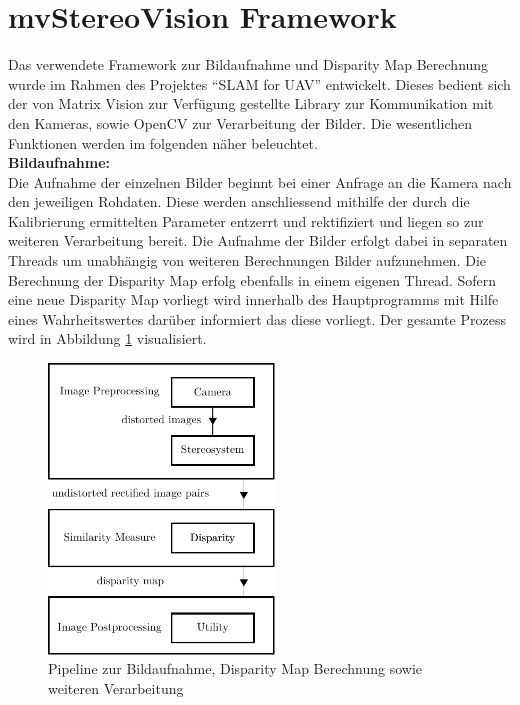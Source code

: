 
\section{mvStereoVision Framework}
\label{sec:framework}
Das verwendete Framework zur Bildaufnahme und Disparity Map Berechnung wurde im Rahmen des Projektes “SLAM for UAV” entwickelt. Dieses bedient sich der von Matrix Vision zur Verfügung gestellte Library \cite{matrixvision} zur Kommunikation mit den Kameras, sowie OpenCV \cite{opencv} zur Verarbeitung der Bilder. Die wesentlichen Funktionen werden im folgenden näher beleuchtet.\\

\noindent
\textbf{Bildaufnahme:}\\
Die Aufnahme der einzelnen Bilder beginnt bei einer Anfrage an die Kamera nach den jeweiligen Rohdaten. Diese werden anschliessend mithilfe der durch die Kalibrierung ermittelten Parameter entzerrt und rektifiziert und liegen so zur weiteren Verarbeitung bereit. Die Aufnahme der Bilder erfolgt dabei in separaten Threads um unabhängig von weiteren Berechnungen Bilder aufzunehmen. Die Berechnung der Disparity Map erfolg ebenfalls in einem eigenen Thread. Sofern eine neue Disparity Map vorliegt wird innerhalb des Hauptprogramms mit Hilfe eines Wahrheitswertes darüber informiert das diese vorliegt. Der gesamte Prozess wird in Abbildung \ref{fig:framework_pipeline} visualisiert.

\begin{figure}[h]
	\begin{center}
		\includegraphics[width=6cm]{img/framework_pipeline.pdf}
	\end{center}
	\caption{Pipeline zur Bildaufnahme, Disparity Map Berechnung sowie weiteren Verarbeitung}
	\label{fig:framework_pipeline}
\end{figure}


